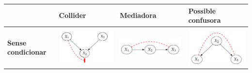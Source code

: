 \documentclass[../main.tex]{subfiles}
\begin{document}
    \begin{table}[h] 
    \centering
    \renewcommand{\arraystretch}{1.5}
        \begin{tabular}{>{\raggedright}m{2.5cm} 
                        >{\centering\arraybackslash}m{3.5cm} 
                        >{\centering\arraybackslash}m{3.5cm} 
                        >{\centering\arraybackslash}m{3.5cm}}
        
        \toprule
         & \textbf{Collider} & \textbf{Mediadora} & \textbf{Possible confusora} \\
        \midrule
        \textbf{Sense condicionar} &
        \includegraphics[width=\linewidth]{imgs/collider_nc.png} &
        \includegraphics[width=\linewidth]{imgs/mediadora_nc.png} &
        \includegraphics[width=\linewidth]{imgs/confusora_nc.png} \\
        

\end{tabular}
\end{table}
\end{document}
